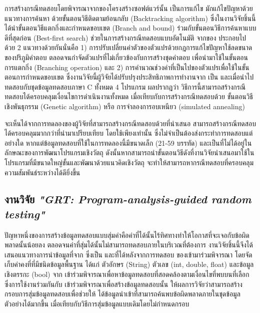 การสร้างกรณีทดสอบโดยพิจารณาจาก{\Path}ของโครงสร้างซอฟต์แวร์นั้น เป็นการแก้ไข\FirstTimeDefine{\csp}{\cspEN} มักแก้ไขปัญหาด้วยแนวทางการค้นหา
ด้วยขั้นตอนวิธีติดตามย้อนกลับ (Backtracking algorithm) ซึ่งในงานวิจัยชิ้นนี้ได้นำขั้นตอนวิธีแตกกิ่งและกำหนดขอบเขต (Branch and bound) 
ร่วมกับขั้นตอนวิธีการค้นหาแบบดีที่สุดก่อน (Best-first search) ช่วยในการสร้างกรณีทดสอบแบบอัตโนมัติ จาก{\StaticInformation}ของ{\sourcecode} 
ประกอบไปด้วย 2 แนวทางด้วยกันนั่นคือ 
1) การปรับเปลี่ยนค่าตัวของตัวแปรด้วยกฎการแก้ไขปัญหาใช้ลดขนาดของปริภูมิคำตอบ ตลอดจนกำจัดตัวแปรที่ไม่เกี่ยวข้องกับการสร้างชุดคำตอบ 
เพื่อนำมาใช้ในขั้นตอนการแตกกิ่ง (Branching operation) และ 2) การคำนวณช่วงค่าที่เป็นไปของตัวแปรเพื่อใช้ในขั้นตอนการกำหนดขอบเขต
ซึ่งงานวิจัยนี้ผู้วิจัยได้ปรับปรุงประสิทธิภาพการทำงานจาก  เป็น  และเมื่อนำไปทดสอบกับชุดข้อมูลทดสอบภาษา C ทั้งหมด 4 โปรแกรม
ผลปรากฎว่า วิธีการนี้สามารถสร้างกรณีทดสอบได้ครอบคลุมเงื่อนไขการดำเนินงานทั้งหมด เมื่อเทียบกับการสร้างกรณีทดสอบด้วย ขั้นตอนวิธีเชิงพันธุกรรม (Genetic algorithm)
หรือ การจำลองการอบเหนียว (simulated annealing) %

จะเห็นได้จากการทดลองของผู้วิจัยที่สามารถสร้างกรณีทดสอบด้วย{\Algorithm}ที่นำเสนอ สามารถสร้างกรณีทดสอบได้ครอบคลุมมากกว่า{\Algorithm}ที่นำมาเปรียบเทียบ 
โดยใช้เพียง{\StaticInformation}เท่านั้น ซึ่งไม่จำเป็นต้องส่งกระทำการทดสอบ{\sourcecode}แต่อย่างใด หากแต่ข้อมูลทดสอบที่ใช้ในการทดลองนี้มีขนาดเล็ก 
(21-59 บรรทัด) และเป็น{\sourcecode}ที่ไม่ได้อยู่ในลักษณะของการพัฒนาโปรแกรมเชิงวัตถุ 
ดังนั้นหากสามารถนำขั้นตอนวิธีดังที่งานวิจัยนำเสนอมาใช้ในโปรแกรมที่มีขนาดใหญ่ขั้นและพัฒนาด้วยแนวคิดเชิงวัตถุ 
จะทำให้สามารถหากรณีทดสอบที่ครอบคลุมความสัมพันธ์ระหว่าง{\softwareComponent}ได้ดียิ่งขึ้น

\subsection{งานวิจัย {\it "GRT: Program-analysis-guided random testing"} \cite{Ma2016}}
\label{sec:sub:grt}

ปัญหาหนึ่งของการสร้างข้อมูลทดสอบแบบสุ่มค่าคือค่าที่ได้นั้นไร้ทิศทางทำให้โอกาสที่จะเจอกับข้อผิดพลาดนั้นน้อยลง 
ตลอดจนค่าที่สุ่มได้นั้นไม่สามารถทดสอบ{\sourcecode}ภายในบริเวณที่ต้องการ งานวิจัยชิ้นนี้จึงได้เสนอแนวทางการนำข้อมูลที่จาก{\sourcecode}
ซึ่งเป็น{\StaticInformation} และ{\DynamicInformation}ที่ได้หลังจากการทดสอบ{\software} 
ของ{\SUT}เข้ามาร่วมพิจารณา โดยจัดเก็บค่าคงที่ที่มีชนิดข้อมูลพื้นฐาน ได้แก่ ตัวอักษร ({\code String}) ตัวเลข ({\code int, double, float}) 
และข้อมูลเชิงตรรกะ ({\code bool}) จาก{\sourcecode} เข้าร่วมพิจารณาเพื่อหาข้อมูลทดสอบที่สอดคล้องตามเงื่อนไขที่พบบน{\TestPath}ที่เลือก 
ซึ่งการใช้งาน{\StaticInformation}ร่วมกันกับ{\DynamicInformation} เข้าร่วมพิจารณาเพื่อสร้างข้อมูลทดสอบนั้น 
ให้ผลการวิจัยว่าสามารถสร้างกรอบการสุ่มข้อมูลทดสอบเพื่อช่วยให้ ได้ข้อมูลนำเข้าที่สามารถค้นพบข้อผิดพลาดภายในชุดข้อมูลตัวอย่างได้มากขึ้น 
เมื่อเทียบกับวิธีการสุ่มข้อมูลแบบเดิมโดยไม่กำหนดกรอบ

